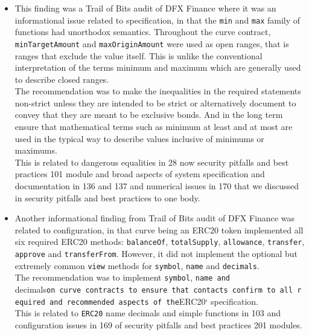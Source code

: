 \begin{itemize}
\item
  This finding was a Trail of Bits audit of DFX Finance where it was an
  informational issue related to specification, in that the \texttt{min}
  and \texttt{max} family of functions had unorthodox semantics.
  Throughout the curve contract, \texttt{minTargetAmount} and
  \texttt{maxOriginAmount} were used as open ranges, that is ranges that
  exclude the value itself. This is unlike the conventional
  interpretation of the terms minimum and maximum which are generally
  used to describe closed ranges.\\

  The recommendation was to make the inequalities in the required
  statements non-strict unless they are intended to be strict or
  alternatively document to convey that they are meant to be exclusive
  bonds. And in the long term ensure that mathematical terms such as
  minimum at least and at most are used in the typical way to describe
  values inclusive of minimums or maximums.\\

  This is related to dangerous equalities in 28 now security pitfalls
  and best practices 101 module and broad aspects of system
  specification and documentation in 136 and 137 and numerical issues in
  170 that we discussed in security pitfalls and best practices to one
  body.
\item
  Another informational finding from Trail of Bits audit of DFX Finance
  was related to configuration, in that curve being an ERC20 token
  implemented all six required ERC20 methods: \texttt{balanceOf},
  \texttt{totalSupply}, \texttt{allowance}, \texttt{transfer},
  \texttt{approve} and \texttt{transferFrom}. However, it did not
  implement the optional but extremely common \texttt{view} methods for
  \texttt{symbol}, \texttt{name} and \texttt{decimals}.\\

  The recommendation was to implement \texttt{symbol},
  \texttt{name\ and}
  decimals\texttt{on\ curve\ contracts\ to\ ensure\ that\ contacts\ confirm\ to\ all\ required\ and\ recommended\ aspects\ of\ the}ERC20`
  specification.\\

  This is related to \texttt{ERC20} name decimals and simple functions
  in 103 and configuration issues in 169 of security pitfalls and best
  practices 201 modules.
\end{itemize}

